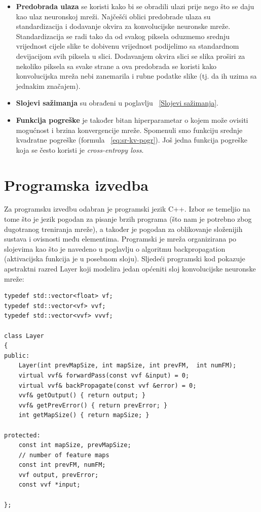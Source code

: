\documentclass[times, utf8, zavrsni]{fer}
\begin{document}
\begin{itemize}
\item \textbf{Predobrada ulaza} se koristi kako bi se obradili ulazi prije nego što se daju kao ulaz neuronskoj mreži. Najčešći oblici predobrade ulaza su standardizacija i dodavanje okvira za konvolucijske neuronske mreže. Standardizacija se radi tako da od svakog piksela oduzmemo srednju vrijednost cijele slike te dobivenu vrijednost podijelimo sa standardnom devijacijom svih piksela u slici. Dodavanjem okvira slici se slika proširi za nekoliko piksela sa svake strane a ova predobrada se koristi kako konvolucijska mreža nebi zanemarila i rubne podatke slike (tj. da ih uzima sa jednakim značajem).

\item \textbf{Slojevi sažimanja} su obrađeni u poglavlju ~\ref{Slojevi sažimanja}.

\item \textbf{Funkcija pogreške} je također bitan hiperparametar o kojem može ovisiti mogućnost i brzina konvergencije mreže. Spomenuli smo funkciju srednje kvadratne pogreške (formula ~\ref{eq:sr-kv-pogr}). Još jedna funkcija pogreške koja se često koristi je \textit{cross-entropy loss}.

\end{itemize}

\chapter{Programska izvedba}
Za programsku izvedbu odabran je programski jezik C++. Izbor se temeljio na tome što je jezik pogodan za pisanje brzih programa (što nam je potrebno zbog dugotranog treniranja mreže), a također je pogodan za oblikovanje složenijih sustava i ovisnosti među elementima. Programski je mreža organizirana po slojevima kao što je navedeno u poglavlju o algoritmu backpropagation (aktivacijska funkcija je u posebnom sloju). Sljedeći programski kod pokazuje apstraktni razred Layer koji modelira jedan općeniti sloj konvolucijske neuronske mreže:

\renewcommand{\lstlistingname}{Programski kod}
\begin{lstlisting}[caption=Razred Layer,
  label=Layer]
typedef std::vector<float> vf;
typedef std::vector<vf> vvf;
typedef std::vector<vvf> vvvf;

class Layer
{
public:
    Layer(int prevMapSize, int mapSize, int prevFM,  int numFM);
    virtual vvf& forwardPass(const vvf &input) = 0;
    virtual vvf& backPropagate(const vvf &error) = 0;
    vvf& getOutput() { return output; }
    vvf& getPrevError() { return prevError; }
    int getMapSize() { return mapSize; }

protected:
    const int mapSize, prevMapSize;
    // number of feature maps
    const int prevFM, numFM;
    vvf output, prevError;
    const vvf *input;

};
\end{lstlisting}
\end{document}
